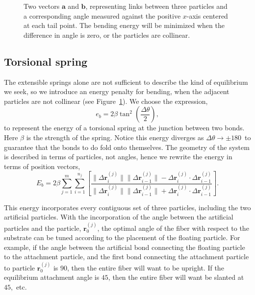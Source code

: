 	\begin{figure}[t]
		\begin{center}
			
		\end{center}		
		\caption{Two vectors $\textbf{a}$ and $\textbf{b}$, representing links between three particles and a corresponding angle measured against the positive $x$-axis centered at each tail point. The bending energy will be minimized when the difference in angle is zero, or the particles are collinear.
		\label{fig:BendingEnergy}}
	\end{figure}	

\subsection{Torsional spring}

	The extensible springs alone are not sufficient to describe the kind of equilibrium we seek, so we introduce an energy penalty for bending, when the adjacent particles are not collinear (see Figure~\ref{fig:BendingEnergy}). We choose the expression,
\begin{equation}
	e_b = 2\beta \tan^2 \left( \frac{\Delta \theta}{2} \right),
\end{equation}
to represent the energy of a torsional spring at the junction between two bonds. Here $\beta$ is the strength of the spring. Notice this energy diverges as $\Delta \theta \to \pm180$\textdegree\ to guarantee that the bonds to do fold onto themselves. The geometry of the system is described in terms of particles, not angles, hence we rewrite the energy in terms of position vectors,
\begin{equation}
	E_b = 2\beta \sum_{j=1}^m \sum_{i=1}^{n_j} \left[ \frac{\|\Delta \textbf{r}_i^{(j)} \| \|\Delta \textbf{r}_{i-1}^{(j)} \| - \Delta \textbf{r}_i^{(j)} \cdot \Delta \textbf{r}_{i-1}^{(j)}}{\|\Delta \textbf{r}_i^{(j)} \| \|\Delta \textbf{r}_{i-1}^{(j)} \| + \Delta \textbf{r}_i^{(j)} \cdot \Delta \textbf{r}_{i-1}^{(j)}} \right].
\end{equation}

	This energy incorporates every contiguous set of three particles, including the two artificial particles. With the incorporation of the angle between the artificial particles and the particle, $\textbf{r}_0^{(j)}$, the optimal angle of the fiber with respect to the substrate can be tuned according to the placement of the floating particle. For example, if the angle between the artificial bond connecting the floating particle to the attachment particle, and the first bond connecting the attachment particle to particle $\textbf{r}_0^{(j)}$ is $90$\textdegree, then the entire fiber will want to be upright. If the equilibrium attachment angle is $45$\textdegree, then the entire fiber will want be slanted at $45$\textdegree,~etc. 

